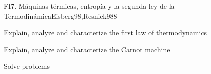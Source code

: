 \begin{syllabus}
\begin{unit}{FI7. Máquinas térmicas, entropía y la segunda ley de la Termodinámica}{Eisberg98,Resnick98}{8}
   \begin{unitgoals}
         \item  Explain, analyze and characterize the first law of thermodynamics
         \item  Explain, analyze and characterize the Carnot machine
         \item  Solve problems
   \end{unitgoals}
\end{unit}

\begin{coursebibliography}
\end{coursebibliography}

\end{syllabus}

%
